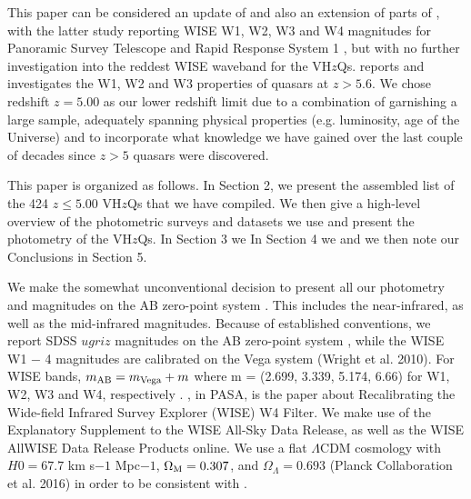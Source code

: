 \documentclass[usenatbib]{mnras}
\begin{document}
This paper can be considered an update of \citet{Blain2013} and also
an extension of parts of \citet{Banados2016}, with the latter study
reporting WISE W1, W2, W3 and W4 magnitudes for Panoramic Survey
Telescope and Rapid Response System 1 \citep[Pan-STARRS1,
PS1;][]{Kaiser2002, Kaiser2010}, but with no further investigation
into the reddest WISE waveband for the VH$z$Qs.  \citet{Banados2016}
reports and investigates the W1, W2 and W3 properties of quasars at $z
> 5.6$. We chose redshift $z=5.00$ as our lower redshift limit due to
a combination of garnishing a large sample, adequately spanning
physical properties (e.g. luminosity, age of the Universe) and to
incorporate what knowledge we have gained over the last couple of
decades since $z>5$ quasars were discovered.

This paper is organized as follows.  In Section 2, we present the
assembled list of the 424 $z\leq5.00$ VH$z$Qs that we have
compiled. We then give a high-level overview of the photometric
surveys and datasets we use and present the photometry of the VH$z$Qs.
In Section 3 we In Section 4 we and we then note our Conclusions in
Section 5.

We make the somewhat unconventional decision to present all our
photometry and magnitudes on the AB zero-point system
\citep{Oke_Gunn1983, Fukugita1996}.  This includes the near-infrared,
as well as the mid-infrared magnitudes.  Because of established
conventions, we report SDSS $ugriz$ magnitudes on the AB zero-point
system \citep{Oke_Gunn1983, Fukugita1996}, while the WISE W1 − 4
magnitudes are calibrated on the Vega system (Wright et al. 2010). For
WISE bands, $m_{\rm AB} = m_{\rm Vega} + m$ where m = (2.699, 3.339,
5.174, 6.66) for W1, W2, W3 and W4, respectively \citep{Cutri2011,
Brown2014b}. \citet{Brown2014b}, in PASA, is the paper about
Recalibrating the Wide-field Infrared Survey Explorer (WISE) W4
Filter. We make use of the Explanatory Supplement to the WISE All-Sky
Data Release, as well as the WISE AllWISE Data Release Products
online.  We use a flat $\Lambda$CDM cosmology with $H0 = 67.7$ km
s$-1$ Mpc$−1$, $\Omega_{\rm M} = 0.307$, and $\Omega_{\Lambda} =
0.693$ (Planck Collaboration et al. 2016) in order to be consistent
with \citet{Banados2016}.
\end{document}
